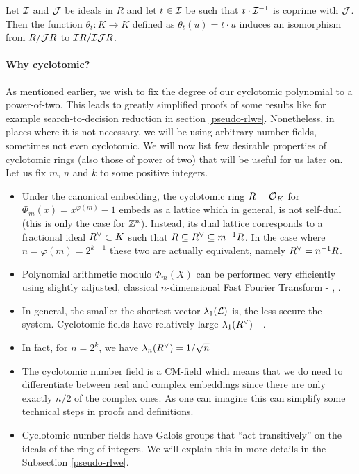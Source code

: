 \begin{proposition}\label{sigma-t}
	Let $\mathcal{I}$ and $\mathcal{J}$ be ideals in $R$ and let $t \in \mathcal{I}$ be such that $t \cdot \mathcal{I}^{-1}$ is coprime with $\mathcal{J}$. Then the function $\theta_t : K \rightarrow K$ defined as $\theta_t(u) = t \cdot u$ induces an isomorphism from $R/\mathcal{J} R$ to $\mathcal{I} R/\mathcal{I} \mathcal{J} R$.
\end{proposition}

\paragraph{Why cyclotomic?}\label{why?}
As mentioned earlier, we wish to fix the degree of our cyclotomic polynomial to a power-of-two. This leads to greatly simplified proofs of some results like for example search-to-decision reduction in section \ref{pseudo-rlwe}. Nonetheless, in places where it is not necessary, we will be using arbitrary number fields, sometimes not even cyclotomic. We will now list few desirable properties of cyclotomic rings (also those of power of two) that will be useful for us later on. Let us fix $m$, $n$ and $k$ to some positive integers.
\begin{itemize}
	\item Under the canonical embedding, the cyclotomic ring $R = \mathcal{O}_K$ for $\Phi_m(x) = x^{\varphi(m)} - 1$ embeds as a lattice which in general, is not self-dual (this is only the case for $\mathbb{Z}^n$). Instead, its dual lattice corresponds to a fractional ideal $R^{\vee} \subset K$ such that $R \subseteq R^{\vee} \subseteq m^{-1}R$. In the case where $n = \varphi(m) =  2^{k-1}$ these two are actually equivalent, namely $R^{\vee} = n^{-1}R$. 
	\item Polynomial arithmetic modulo $\Phi_m(X)$ can be performed very efficiently using slightly adjusted, classical $n$-dimensional Fast Fourier Transform - \cite{toolkit}, \cite{swift}.
	\item In general, the smaller the shortest vector $\lambda_1(\mathcal{L})$ is, the less secure the system. Cyclotomic fields have relatively large $\lambda_1(R^{\vee})$ - \cite{oracle}.
	\item In fact, for $n = 2^k$, we have $\lambda_n(R^{\vee}) = 1/\sqrt{n}$
		\iffalse
	\item They also have relatively small \textit{expansion factors} (roughly speaking it is the ratio of the size of the public key to the size of the secret key) as defined and explained in \cite{expansion}.
		\fi
	\item The cyclotomic number field is a CM-field which means that we do need to differentiate between real and complex embeddings since there are only exactly $n/2$ of the complex ones. As one can imagine this can simplify some technical steps in proofs and definitions.
	\item Cyclotomic number fields have Galois groups that ``act transitively'' on the ideals of the ring of integers. We will explain this in more details in the Subsection \ref{pseudo-rlwe}. 
\end{itemize}
